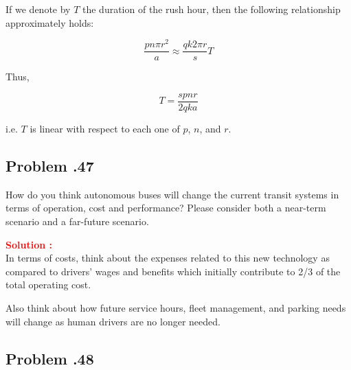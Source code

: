 \documentclass[12pt]{article}
\newcommand{\customsubsection}[1]{
  \subsection*{Problem \thesection.#1}
}
\begin{document}
If we denote by \(T\) the duration of the rush hour, then the following relationship approximately holds:

\[
\frac{pn\pi r^2}{a} \approx \frac{qk2\pi r}{s} T
\]

Thus,

\[
T = \frac{spnr}{2qka}
\]

i.e. \(T\) is linear with respect to each one of \(p\), \(n\), and \(r\).

\newpage

\customsubsection{47}
How do you think autonomous buses will change the current transit systems in terms of operation, cost and performance? Please consider both a near-term scenario and a far-future scenario.


\textbf{\textcolor{red}{Solution :}} \\
In terms of costs, think about the expenses related to this new technology as compared to drivers’ wages and benefits which initially contribute to 2/3 of the total operating cost.

Also think about how future service hours, fleet management, and parking needs will change as human drivers are no longer needed.


\newpage

\customsubsection{48}

\end{document}
